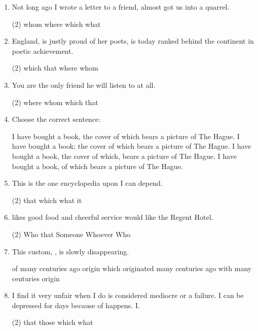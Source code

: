 \begin{enumerate}
\item Not long ago I wrote a letter to a friend, \ttu almost got us into a quarrel.
\begin{tasks}(2)
  \task whom
  \task where
  \task which
  \task what
\end{tasks}

\item England, \ttu is justly proud of her poets, is today ranked behind the continent in poetic achievement.
\begin{tasks}(2)
  \task which
  \task that
  \task where
  \task whom
\end{tasks}

\item You are the only friend \ttu he will listen to at all.
\begin{tasks}(2)
  \task where
  \task whom
  \task which
  \task that
\end{tasks}

\item Choose the correct sentence:
\begin{tasks}
  \task I have bought a book, the cover of which bears a picture of The Hague.
  \task I have bought a book; the cover of which bears a picture of The Hague.
  \task I have bought a book, the cover of which, bears a picture of The Hague.
  \task I have bought a book, of which bears a picture of The Hague.
\end{tasks}

\item This is the one encyclopedia upon \ttu I can depend.
\begin{tasks}(2)
  \task that
  \task which
  \task what
  \task it
\end{tasks}

\item \ttu likes good food and cheerful service would like the Regent Hotel.
\begin{tasks}(2)
  \task Who that
  \task Someone
  \task Whoever
  \task Who
\end{tasks}

\item This custom, \ttu, is slowly disappearing.
\begin{tasks}
  \task of many centuries ago origin
  \task which originated many centuries ago
  \task with many centuries origin
\end{tasks}

\item I find it very unfair when \ttu I do is considered mediocre or a failure. I can be depressed for days because of \ttu happens.
I.
\begin{tasks}(2)
  \task that
  \task those
  \task which
  \task what
\end{tasks}


\end{enumerate}
